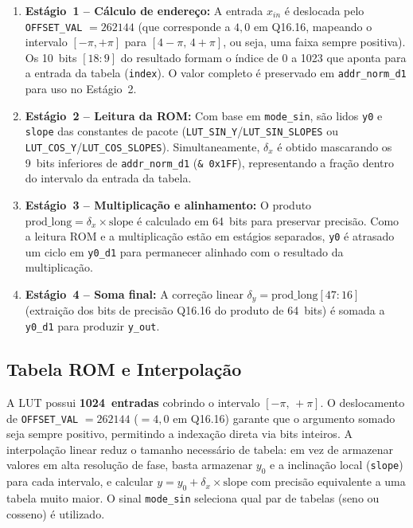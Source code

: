 \documentclass[a4paper,12pt]{article}
\begin{document}
\begin{enumerate}
    \item \textbf{Est\'agio~1 -- C\'alculo de endere\c{c}o:} A entrada $x_{in}$ \'e deslocada
          pelo \texttt{OFFSET\_VAL} $= 262144$ (que corresponde a $4{,}0$ em Q16.16, mapeando
          o intervalo $[-\pi,+\pi]$ para $[4{-}\pi,\, 4{+}\pi]$, ou seja, uma faixa sempre
          positiva). Os 10~bits $[18\!:\!9]$ do resultado formam o \'indice de 0 a 1023 que
          aponta para a entrada da tabela (\texttt{index}). O valor completo \'e preservado em
          \texttt{addr\_norm\_d1} para uso no Est\'agio~2.

    \item \textbf{Est\'agio~2 -- Leitura da ROM:} Com base em \texttt{mode\_sin}, s\~ao lidos
          \texttt{y0} e \texttt{slope} das constantes de pacote
          (\texttt{LUT\_SIN\_Y}/\texttt{LUT\_SIN\_SLOPES} ou
          \texttt{LUT\_COS\_Y}/\texttt{LUT\_COS\_SLOPES}). Simultaneamente, $\delta_x$ \'e
          obtido mascarando os 9~bits inferiores de \texttt{addr\_norm\_d1}
          (\texttt{\& 0x1FF}), representando a fra\c{c}\~ao dentro do intervalo da entrada da tabela.

    \item \textbf{Est\'agio~3 -- Multiplica\c{c}\~ao e alinhamento:} O produto
          $\text{prod\_long} = \delta_x \times \text{slope}$ \'e calculado em 64~bits para
          preservar precis\~ao. Como a leitura ROM e a multiplica\c{c}\~ao est\~ao em est\'agios
          separados, \texttt{y0} \'e atrasado um ciclo em \texttt{y0\_d1} para permanecer
          alinhado com o resultado da multiplica\c{c}\~ao.

    \item \textbf{Est\'agio~4 -- Soma final:} A corre\c{c}\~ao linear $\delta_y =
          \text{prod\_long}[47\!:\!16]$ (extrai\c{c}\~ao dos bits de precis\~ao Q16.16 do
          produto de 64~bits) \'e somada a \texttt{y0\_d1} para produzir \texttt{y\_out}.
\end{enumerate}

\subsection{Tabela ROM e Interpola\c{c}\~ao}

A LUT possui \textbf{1024~entradas} cobrindo o intervalo $[-\pi,\,+\pi]$. O deslocamento de
\texttt{OFFSET\_VAL} $= 262144$ ($= 4{,}0$ em Q16.16) garante que o argumento somado seja
sempre positivo, permitindo a indexa\c{c}\~ao direta via bits inteiros. A interpola\c{c}\~ao
linear reduz o tamanho necess\'ario de tabela: em vez de armazenar valores em alta resolu\c{c}\~ao
de fase, basta armazenar $y_0$ e a inclina\c{c}\~ao local (\texttt{slope}) para cada intervalo,
e calcular $y = y_0 + \delta_x \times \text{slope}$ com precis\~ao equivalente a uma tabela muito
maior. O sinal \texttt{mode\_sin} seleciona qual par de tabelas (seno ou cosseno) \'e utilizado.
\end{document}
